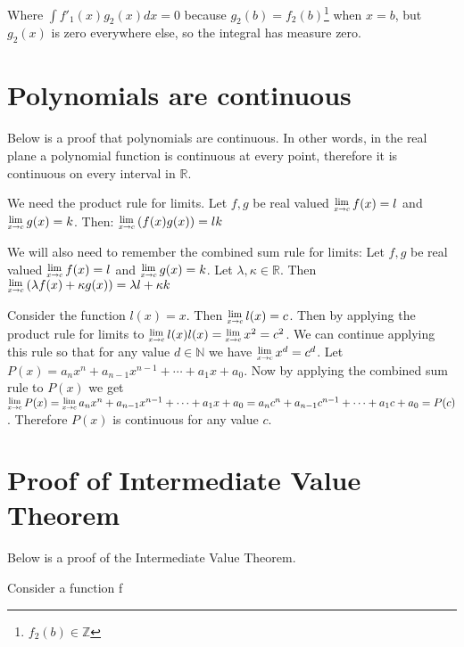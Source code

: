 \documentclass[12pt]{article}
\newcommand{\Lim}[1]{\raisebox{0.5ex}{\scalebox{0.8}{$\displaystyle \lim_{#1}\;$}}}
\begin{document}
\begin{appendices}
Where $\int f'_1(x) g_2(x) dx = 0$ because $g_2(b) = f_2(b)$\footnote{$f_2(b) \in \mathbb{Z}$} when $x=b$, but $g_2(x)$ is zero everywhere else, so the integral has measure zero.



\section*{Polynomials are continuous}
Below is a proof that polynomials are continuous.  In other words, in the real plane a polynomial function is continuous at every point, therefore it is continuous on every interval in $\mathbb{R}$.

We need the product rule for limits.  Let $f,g$ be real valued $\Lim{x \rightarrow c} f(x) = l$ and $\Lim{x \rightarrow c} g(x) = k$.  Then: $\Lim{x \rightarrow c}(f(x)g(x)) = lk$

We will also need to remember the combined sum rule for limits:
Let $f,g$ be real valued $\Lim{x \rightarrow c} f(x) = l$ and $\Lim{x \rightarrow c} g(x) = k$.  Let $\lambda, \kappa \in \mathbb{R}$.  Then $\Lim{x \rightarrow c}(\lambda f(x) + \kappa g(x)) = \lambda l + \kappa k$

Consider the function $l(x) = x$.  Then $\Lim{x \rightarrow c} l(x) =c$.  Then by applying the product rule for limits to $\Lim{x \rightarrow c} l(x) l(x) = \Lim{x \rightarrow c} x^2 =c^2$.  We can continue applying this rule so that for any value $d \in \mathbb{N}$ we have $\Lim{x \rightarrow c} x^d = c^d$.  Let $P(x)=a_nx^n +a_{n-1}x^{n-1}+ \cdots + a_1x+a_0$.  Now by applying the combined sum rule to $P(x)$ we get $\Lim{x \rightarrow c} P(x) = \Lim{x \rightarrow c} a_nx^n +a_{n-1}x^{n-1}+ \cdots + a_1x+a_0 = a_nc^n +a_{n-1}c^{n-1}+ \cdots + a_1c+a_0 = P(c)$.  Therefore $P(x)$ is continuous for any value $c$.





\section*{Proof of Intermediate Value Theorem}
Below is a proof of the Intermediate Value Theorem.

Consider a function f

\end{appendices}
\end{document}
